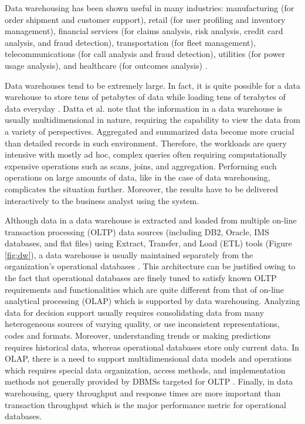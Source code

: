 \documentclass[12pt,a4paper]{article}
\begin{document}
Data warehousing has been shown useful in many industries: manufacturing (for order shipment and customer support), retail (for user profiling and inventory
management), financial services (for claims analysis, risk analysis, credit card analysis, and fraud detection), transportation (for fleet management),
telecommunications (for call analysis and fraud detection), utilities (for power usage analysis), and healthcare (for outcomes analysis)
\cite{chaudhuri1997overview}.

Data warehouses tend to be extremely large. In fact, it is quite possible for a data warehouse to store tens of petabytes of data while loading tens of
terabytes
of data everyday \cite{thusoo2010data}. Datta et al. \cite {datta2002parallel} note that the information in a data warehouse is usually multidimensional in
nature, requiring the capability to view the data from a variety of perspectives. Aggregated and summarized data become more crucial than detailed records in
such environment. Therefore, the workloads are query intensive with mostly ad hoc, complex queries often requiring computationally expensive operations such as
scans, joins, and aggregation. Performing such operations on large amounts of data, like in the case of data warehousing, complicates the situation further.
Moreover, the results have to be delivered interactively to the business analyst using the system.

Although data in a data warehouse is extracted and loaded from multiple on-line transaction processing (OLTP) data sources (including DB2, Oracle, IMS
databases, and flat files) using Extract, Transfer, and Load (ETL) tools (Figure \ref{fig:dw}), a data warehouse is usually maintained separately from the
organization's operational databases \cite{sen2005comparison, chaudhuri1997overview}. This architecture can be justified owing to the fact that operational
databases are finely tuned to satisfy known OLTP requirements and functionalities which are quite different from that of on-line analytical processing (OLAP)
which is supported by data warehousing. Analyzing data for decision support usually requires consolidating data from many heterogeneous sources of varying
quality, or use inconsistent representations, codes and formats. Moreover, understanding trends or making predictions requires historical data, whereas
operational databases store only current data. In OLAP, there is a need to support multidimensional data models and operations which requires special data
organization, access methods, and implementation methods not generally provided by DBMSs targeted for OLTP \cite{chaudhuri1997overview}. Finally, in data
warehousing, query throughput and response times are more important than transaction throughput which is the major performance metric for operational databases.
\end{document}
